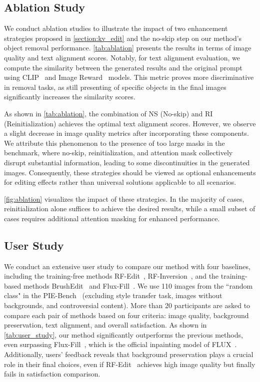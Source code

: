 
\subsection{Ablation Study}
We conduct ablation studies to illustrate the impact of two enhancement strategies proposed in \cref{section:kv_edit} and the no-skip step on our method's object removal performance. \cref{tab:ablation} presents the results in terms of image quality and text alignment scores. Notably, for text alignment evaluation, we compute the similarity between the generated results and the original prompt using CLIP~\cite{radford2021learning} and Image Reward~\cite{xu2023imagereward} models. This metric proves more discriminative in removal tasks, as still presenting of specific objects in the final images significantly increases the similarity scores.

As shown in \cref{tab:ablation}, the combination of NS (No-skip) and RI (Reinitialization) achieves the optimal text alignment scores. However, we observe a slight decrease in image quality metrics after incorporating these components. We attribute this phenomenon to the presence of too large masks in the benchmark, where no-skip, reinitialization, and attention mask collectively disrupt substantial information, leading to some discontinuities in the generated images. Consequently, these strategies should be viewed as optional enhancements for editing effects rather than universal solutions applicable to all scenarios.

\cref{fig:ablation} visualizes the impact of these strategies. In the majority of cases, reinitialization alone suffices to achieve the desired results, while a small subset of cases requires additional attention masking for enhanced performance.

\subsection{User Study}
We conduct an extensive user study to compare our method with four baselines, including the training-free methods RF-Edit~\cite{wang2024taming}, RF-Inversion~\cite{rout2024semantic}, and the training-based methods BrushEdit~\cite{li2024brushedit} and Flux-Fill~\cite{flux}. We use 110 images from the ``random class" in the PIE-Bench~\cite{ju2024pnp} (excluding style transfer task, images without backgrounds, and controversial content). More than 20 participants are asked to compare each pair of methods based on four criteria: image quality, background preservation, text alignment, and overall satisfaction. As shown in \cref{tab:user_study}, our method significantly outperforms the previous methods, even surpassing Flux-Fill~\cite{flux}, which is the official inpainting model of FLUX~\cite{flux}. Additionally, users' feedback reveals that background preservation plays a crucial role in their final choices, even if RF-Edit~\cite{wang2024taming} achieves high image quality but finally fails in satisfaction comparison. 

